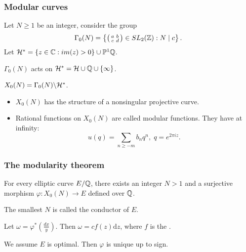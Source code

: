 \documentclass[handout]{beamer}
\begin{document}

\begin{frame}
\frametitle{Modular curves}
Let $N \geq 1$ be an integer, consider the group 
\[
	\Gamma_0(N) = \left \{ \left( \begin{smallmatrix}a&b\\c&d\end{smallmatrix}\right) \in SL_2(\mathbb{Z}): N \mid c \right\}.
\]
Let $\mathcal{H}^* = \{z \in \mathbb{C}: im(z) > 0\} \cup \mathbb{P}^1{\mathbb{Q}}$. 

$\Gamma_0(N)$ acts on $\mathcal{H}^{*} = \mathcal{H} \cup \mathbb{Q} \cup \{\infty\}$. 

\begin{Def}
$X_0(N) = \Gamma_0(N) \backslash \mathcal{H}^*$.
\end{Def}

\begin{itemize}
\item $X_0(N)$ has the structure of a  nonsingular projective curve.
\item Rational functions on $X_0(N)$ are called modular functions. They have  at infinity:
\[
	u(q)  = \sum_{n \geq -m} b_n q^n, \; q = e^{2 \pi i z}. 
\]
\end{itemize}
\end{frame}

\begin{frame}
\frametitle{The modularity theorem}


\begin{theorem}[Modularity]
For every elliptic curve $E/\mathbb{Q}$, there exists an integer $N > 1$ and a surjective morphism 
$\varphi: X_0(N) \to E$ defined over $\mathbb{Q}$.
\end{theorem}

\pause
\smallskip

The smallest $N$ is called the conductor of $E$.  \\
\smallskip

Let $\omega = \varphi^*(\frac{dx}{y})$. Then $\omega = c f(z) \mathrm{d} z$, where $f$ is the .  \\

\smallskip

We assume $E$ is optimal. Then $\varphi$ is unique up to sign.



\end{frame}
\end{document}
